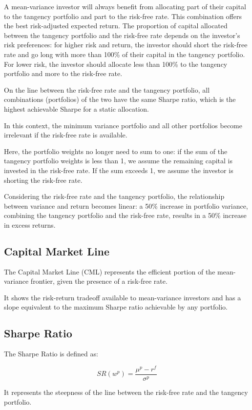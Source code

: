\documentclass{article}
\begin{document}
A mean-variance investor will always benefit from allocating part of their capital to the tangency portfolio and part to the risk-free rate. This combination offers the best risk-adjusted expected return. The proportion of capital allocated between the tangency portfolio and the risk-free rate depends on the investor's risk preferences: for higher risk and return, the investor should short the risk-free rate and go long with more than 100\% of their capital in the tangency portfolio. For lower risk, the investor should allocate less than 100\% to the tangency portfolio and more to the risk-free rate.

On the line between the risk-free rate and the tangency portfolio, all combinations (portfolios) of the two have the same Sharpe ratio, which is the highest achievable Sharpe for a static allocation.

In this context, the minimum variance portfolio and all other portfolios become irrelevant if the risk-free rate is available.

Here, the portfolio weights no longer need to sum to one: if the sum of the tangency portfolio weights is less than 1, we assume the remaining capital is invested in the risk-free rate. If the sum exceeds 1, we assume the investor is shorting the risk-free rate.

Considering the risk-free rate and the tangency portfolio, the relationship between variance and return becomes linear: a 50\% increase in portfolio variance, combining the tangency portfolio and the risk-free rate, results in a 50\% increase in excess returns.

\subsection{Capital Market Line}
The Capital Market Line (CML) represents the efficient portion of the mean-variance frontier, given the presence of a risk-free rate.

It shows the risk-return tradeoff available to mean-variance investors and has a slope equivalent to the maximum Sharpe ratio achievable by any portfolio.

\subsection{Sharpe Ratio}
The Sharpe Ratio is defined as:

$$
SR({w}^{p})=\frac{{\mu}^{p}-r^{f}}{{\sigma}^{p}}
$$

It represents the steepness of the line between the risk-free rate and the tangency portfolio.
\end{document}

